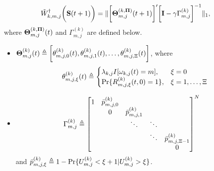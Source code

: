 \begin{lemma}
    \label{lemma:w_ap}
    \begin{align}
        &\tilde{W}^{\dagger}_{k,m,j}\bigg(\mathbf{S}(t+1)\bigg) =
        \lVert
            \bigg[
                \boldsymbol{\Theta}^{(k, \boldsymbol{\Pi})}_{m,j}(t+1)
            \bigg]'
            \bigg[
                \mathbf{I} - \gamma \Gamma^{(k)}_{m,j}
            \bigg]^{-1}
        \|_1,
        \label{w_ap}
    \end{align}
    where $\boldsymbol{\Theta}^{(k, \boldsymbol{\Pi})}_{m,j}(t)$ and $\Gamma^{(k)}_{m,j}$ are defined below.
    \begin{itemize}
        \item $\boldsymbol{\Theta}^{(k)}_{m,j}(t) \triangleq \bigg[ \theta^{(k)}_{m,j,0}(t), \theta^{(k)}_{m,j,1}(t), \dots, \theta^{(k)}_{m,j,\Xi}(t) \bigg]$,
        where 
        \begin{align}
            \theta^{(k)}_{m,j,\xi}(t) \triangleq 
            \begin{cases}
                \lambda_{k,j} I[\omega_{k,j}(t)=m], & \xi=0
                \\
                \Pr\{R^{(k)}_{m,j,\xi}(t,0) = 1\}, & \xi=1,\dots,\Xi
            \end{cases}
        \end{align}
        \item
        \begin{align}
            \Gamma^{(k)}_{m,j} &\triangleq
            \begin{bmatrix}
                1 & \bar{p}^{(k)}_{m,j,0} &                       &        &                           \\
                  & 0                     & \bar{p}^{(k)}_{m,j,1} &        &                           \\
                  &                       & \ddots                & \ddots &                           \\
                  &                       &                       & \ddots & \bar{p}^{(k)}_{m,j,\Xi-1} \\
                  &                       &                       &        & 0                         \\
            \end{bmatrix}^{N}
        \end{align}
        and $\bar{p}^{(k)}_{m,j,\xi} \triangleq 1 - \Pr\{U^{(k)}_{m,j} < \xi+1 | U^{(k)}_{m,j}>\xi\}$.
    \end{itemize}
\end{lemma}
